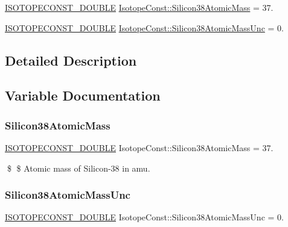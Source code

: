 \begin{DoxyCompactItemize}
\item 
\mbox{\hyperlink{group___isotope_const-_macros_ga8f45a7272ce02c0b4c65c44636ed719a}{I\+S\+O\+T\+O\+P\+E\+C\+O\+N\+S\+T\+\_\+\+D\+O\+U\+B\+LE}} \mbox{\hyperlink{group___isotope_const-_silicon-_si38_ga203dde92c7a884689dee6d6f6e3d2d5d}{Isotope\+Const\+::\+Silicon38\+Atomic\+Mass}} = 37.
\item 
\mbox{\hyperlink{group___isotope_const-_macros_ga8f45a7272ce02c0b4c65c44636ed719a}{I\+S\+O\+T\+O\+P\+E\+C\+O\+N\+S\+T\+\_\+\+D\+O\+U\+B\+LE}} \mbox{\hyperlink{group___isotope_const-_silicon-_si38_ga74a188b4b295a312919cc63850a4529b}{Isotope\+Const\+::\+Silicon38\+Atomic\+Mass\+Unc}} = 0.
\end{DoxyCompactItemize}


\subsection{Detailed Description}


\subsection{Variable Documentation}
\mbox{\label{group___isotope_const-_silicon-_si38_ga203dde92c7a884689dee6d6f6e3d2d5d}} 
\subsubsection{\texorpdfstring{Silicon38\+Atomic\+Mass}{Silicon38AtomicMass}}
{\footnotesize\ttfamily \mbox{\hyperlink{group___isotope_const-_macros_ga8f45a7272ce02c0b4c65c44636ed719a}{I\+S\+O\+T\+O\+P\+E\+C\+O\+N\+S\+T\+\_\+\+D\+O\+U\+B\+LE}} Isotope\+Const\+::\+Silicon38\+Atomic\+Mass = 37.}

\$ \$ Atomic mass of Silicon-\/38 in amu. \mbox{\label{group___isotope_const-_silicon-_si38_ga74a188b4b295a312919cc63850a4529b}} 
\subsubsection{\texorpdfstring{Silicon38\+Atomic\+Mass\+Unc}{Silicon38AtomicMassUnc}}
{\footnotesize\ttfamily \mbox{\hyperlink{group___isotope_const-_macros_ga8f45a7272ce02c0b4c65c44636ed719a}{I\+S\+O\+T\+O\+P\+E\+C\+O\+N\+S\+T\+\_\+\+D\+O\+U\+B\+LE}} Isotope\+Const\+::\+Silicon38\+Atomic\+Mass\+Unc = 0.}

